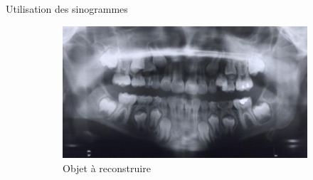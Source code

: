 \documentclass{beamer}
\begin{document}
\begin{frame}{Utilisation des sinogrammes}
    \begin{figure}[t]
        \centering
        \begin{subfigure}[b]{0.55\textwidth}
            \includegraphics[width=\textwidth]{radio_dent.jpeg}
            \caption{Objet à reconstruire}
        \end{subfigure}
        \pause
        \qquad \qquad 
        \begin{subfigure}[b]{0.25\textwidth}

\end{subfigure}
\end{figure}
\end{frame}
\end{document}
